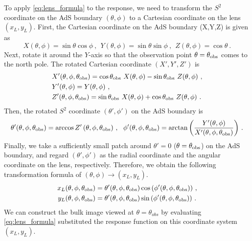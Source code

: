 \documentclass[a4paper,11pt]{article}
\begin{document}
    
    To apply \eqref{eq:lens_formula} to the response, we need to transform the $S^2$ coordinate on the AdS boundary $(\theta,\phi)$ to a Cartesian coordinate on the lens $(x_L,y_L)$.  
    First, the Cartesian coordinate on the AdS boundary (X,Y,Z) is given as
    \begin{equation}
        X(\theta,\phi)=\sin{\theta} \cos{\phi}\ ,
        \ \ 
        Y(\theta,\phi)=\sin{\theta} \sin{\phi}\ ,
        \ \ 
        Z(\theta,\phi)=\cos{\theta}\ .
    \end{equation}
    Next, rotate it around the $Y$-axis so that the observation point $\theta=\theta_{\rm{obs}}$ comes to the north pole. The rotated Cartesian coordinate $(X',Y',Z')$ is
    \begin{align}
        &X'(\theta,\phi,\theta_{\rm{obs}})
        =\cos{\theta_{\rm{obs}}}~X(\theta,\phi)-\sin{\theta_{\rm{obs}}}~Z(\theta,\phi)\ ,\\
        &Y'(\theta,\phi)
        =Y(\theta,\phi)\ ,\\
        &Z'(\theta,\phi,\theta_{\rm{obs}})
        =\sin{\theta_{\rm{obs}}}~X(\theta,\phi)+\cos{\theta_{\rm{obs}}}~Z(\theta,\phi)\ .
    \end{align}
    Then, the rotated $S^2$ coordinate $(\theta', \phi')$ on the AdS boundary is
    \begin{align}
        \theta'(\theta,\phi,\theta_{\rm{obs}})
        =\arccos{Z'\left(\theta,\phi,\theta_{\rm{obs}}\right)}\ ,
        \ \ 
        \phi'(\theta,\phi,\theta_{\rm{obs}})
        =\arctan{\left(\frac{Y'(\theta,\phi)}{X'(\theta,\phi,\theta_{\rm{obs}})}\right)}\ .
    \end{align}
    Finally, we take a sufficiently small patch around $\theta'=0$ ($\theta=\theta_{\rm{obs}}$) on the AdS boundary, and regard $(\theta',\phi')$ as the radial coordinate and the angular coordinate on the lens, respectively. Therefore, we obtain the following transformation formula of $(\theta,\phi) \rightarrow (x_L,y_L)$.
    \begin{align}
        x_L(\theta,\phi,\theta_{\rm{obs}})
        &=\theta'(\theta,\phi,\theta_{\rm{obs}})\cos{\left(\phi'(\theta,\phi,\theta_{\rm{obs}})\right)}\ ,\\
        y_L(\theta,\phi,\theta_{\rm{obs}})
        &=\theta'(\theta,\phi,\theta_{\rm{obs}})\sin{\left(\phi'(\theta,\phi,\theta_{\rm{obs}})\right)}\ .
    \end{align}
    We can construct the bulk image viewed at $\theta= \theta_{obs}$ by evaluating \eqref{eq:lens_formula} substituted the response function on this coordinate system $(x_L, y_L)$.
    
\end{document}
